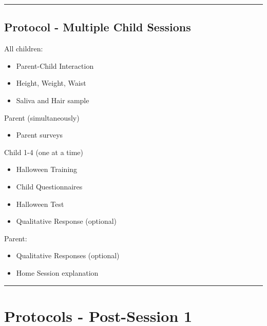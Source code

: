 \documentclass[]{book}
\providecommand{\tightlist}{%
  \setlength{\itemsep}{0pt}\setlength{\parskip}{0pt}}
\begin{document}
\begin{center}\rule{0.5\linewidth}{0.5pt}\end{center}

\hypertarget{protocol---multiple-child-sessions}{%
\subsection{Protocol - Multiple Child Sessions}\label{protocol---multiple-child-sessions}}

All children:

\begin{itemize}
\tightlist
\item
  Parent-Child Interaction
\item
  Height, Weight, Waist
\item
  Saliva and Hair sample
\end{itemize}

Parent (simultaneously)

\begin{itemize}
\tightlist
\item
  Parent surveys
\end{itemize}

Child 1-4 (one at a time)

\begin{itemize}
\tightlist
\item
  Halloween Training
\item
  Child Questionnaires
\item
  Halloween Test
\item
  Qualitative Response (optional)
\end{itemize}

Parent:

\begin{itemize}
\tightlist
\item
  Qualitative Responses (optional)
\item
  Home Session explanation
\end{itemize}

\begin{center}\rule{0.5\linewidth}{0.5pt}\end{center}

\hypertarget{protocols---post-session-1}{%
\section{Protocols - Post-Session 1}\label{protocols---post-session-1}}
\end{document}
